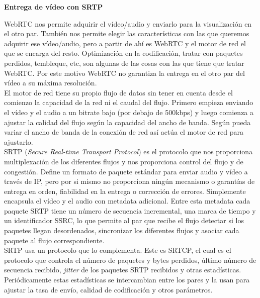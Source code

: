 \begin{normalsize}
\noindent \textbf{Entrega de vídeo con SRTP}\\
\end{normalsize}

WebRTC nos permite adquirir el vídeo/audio y enviarlo para la visualización en el otro par. También nos permite elegir las características con las que queremos adquirir ese vídeo/audio, pero a partir de ahí es WebRTC y el motor de red el que se encarga del resto. Optimización en la codificación, tratar con paquetes perdidos, tembleque, etc, son algunas de las cosas con las que tiene que tratar WebRTC. Por este motivo WebRTC no garantiza la entrega en el otro par del vídeo a su máxima resolución.\\

El motor de red tiene su propio flujo de datos sin tener en cuenta desde el comienzo la capacidad de la red ni el caudal del flujo. Primero empieza enviando el vídeo y el audio a un bitrate bajo (por debajo de 500kbps) y luego comienza a ajustar la calidad del flujo según la capacidad del ancho de banda. Según pueda variar el ancho de banda de la conexión de red así actúa el motor de red para ajustarlo.\\

SRTP (\emph{Secure Real-time Transport Protocol}) es el protocolo que nos proporciona multiplexación de los diferentes flujos y nos proporciona control del flujo y de congestión. Define un formato de paquete estándar para enviar audio y vídeo a través de IP, pero por si mismo no proporciona ningún mecanismo o garantías de entrega en orden, fiabilidad en la entrega o corrección de errores. Simplemente encapsula el vídeo y el audio con metadata adicional. Entre esta metadata cada paquete SRTP tiene un número de secuencia incremental, una marca de tiempo y un identificador SSRC, lo que permite al par que recibe el flujo detectar si los paquetes llegan desordenados, sincronizar los diferentes flujos y asociar cada paquete al flujo correspondiente.\\

SRTP usa un protocolo que lo complementa. Este es SRTCP, el cual es el protocolo que controla el número de paquetes y bytes perdidos, último número de secuencia recibido, \emph{jitter} de los paquetes SRTP recibidos y otras estadísticas. Periódicamente estas estadísticas se intercambian entre los pares y la usan para ajustar la tasa de envío, calidad de codificación y otros parámetros.\\

